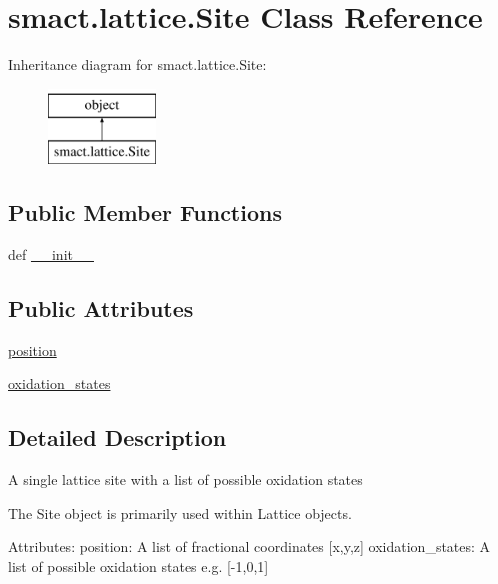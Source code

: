 \hypertarget{classsmact_1_1lattice_1_1_site}{}\section{smact.\+lattice.\+Site Class Reference}
\label{classsmact_1_1lattice_1_1_site}
Inheritance diagram for smact.\+lattice.\+Site\+:\begin{figure}[H]
\begin{center}
\leavevmode
\includegraphics[height=2.000000cm]{classsmact_1_1lattice_1_1_site}
\end{center}
\end{figure}
\subsection*{Public Member Functions}
\begin{DoxyCompactItemize}
\item 
def \hyperlink{classsmact_1_1lattice_1_1_site_a0c838c2b11ae9e20000de848c32a54fd}{\+\_\+\+\_\+init\+\_\+\+\_\+}
\end{DoxyCompactItemize}
\subsection*{Public Attributes}
\begin{DoxyCompactItemize}
\item 
\hyperlink{classsmact_1_1lattice_1_1_site_a5efb051f6bc1d551ad5f68417158fba7}{position}
\item 
\hyperlink{classsmact_1_1lattice_1_1_site_afd3f05ccf43e4f9199033787f0969fcd}{oxidation\+\_\+states}
\end{DoxyCompactItemize}


\subsection{Detailed Description}
\begin{DoxyVerb}A single lattice site with a list of possible oxidation states

The Site object is primarily used within Lattice objects.

Attributes:
    position: A list of fractional coordinates [x,y,z]
    oxidation_states: A list of possible oxidation states e.g. [-1,0,1]\end{DoxyVerb}
 

